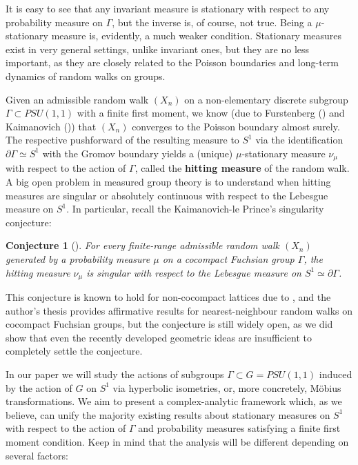 \documentclass[11pt]{article}
\newtheorem{conjecture}{Conjecture}[section]
\begin{document}
It is easy to see that any invariant measure is stationary with respect to any probability measure on $\Gamma$, but the inverse is, of course, not true. Being a $\mu$-stationary measure is, evidently, a much weaker condition. Stationary measures exist in very general settings, unlike invariant ones, but they are no less important, as they are closely related to the Poisson boundaries and long-term dynamics of random walks on groups. 

Given an admissible random walk $(X_n)$ on a non-elementary discrete subgroup $\Gamma \subset PSU(1,1)$ with a finite first moment, we know (due to Furstenberg (\cite{furstenberg71}) and Kaimanovich (\cite{kaimanovich2000poisson})) that $(X_n)$ converges to the Poisson boundary almost surely. The respective pushforward of the resulting measure to $S^1$ via the identification $\partial \Gamma \simeq S^1$ with the Gromov boundary yields a (unique) $\mu$-stationary measure $\nu_\mu$ with respect to the action of $\Gamma$, called the \textbf{hitting measure} of the random walk. A big open problem in measured group theory is to understand when hitting measures are singular or absolutely continuous with respect to the Lebesgue measure on $S^1$. In particular, recall the Kaimanovich-le Prince's singularity conjecture:

\begin{conjecture}[\cite{kaimanovich2011matrix}]
	\label{Fuchsian singularity conjecture}
	For every finite-range admissible random walk $(X_n)$ generated by a probability measure $\mu$ on a cocompact Fuchsian group $\Gamma$, the hitting measure $\nu_\mu$ is singular with respect to the Lebesgue measure on $S^1 \simeq \partial \Gamma$.
\end{conjecture}

This conjecture is known to hold for non-cocompact lattices due to \cite{guivarch1990}, and the author's thesis \cite{mythesis} provides affirmative results for nearest-neighbour random walks on cocompact Fuchsian groups, but the conjecture is still widely open, as we did show that even the recently developed geometric ideas are insufficient to completely settle the conjecture.

In our paper we will study the actions of subgroups $\Gamma \subset G = PSU(1,1)$ induced by the action of $G$ on $S^1$ via hyperbolic isometries, or, more concretely, M\"{o}bius transformations. We aim to present a complex-analytic framework which, as we believe, can unify the majority existing results about stationary measures on $S^1$ with respect to the action of $\Gamma$ and probability measures satisfying a finite first moment condition. Keep in mind that the analysis will be different depending on several factors:
\end{document}

